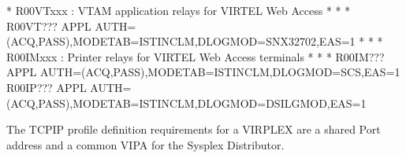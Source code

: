 \documentclass[letterpaper,10pt,english]{sphinxmanual}
\begin{document}
\begin{sphinxVerbatim}[commandchars=\\\{\}]
* R00VTxxx    : VTAM application relays for VIRTEL Web Access        *
* \PYGZhy{}\PYGZhy{}\PYGZhy{}\PYGZhy{}\PYGZhy{}\PYGZhy{}\PYGZhy{}\PYGZhy{}\PYGZhy{}\PYGZhy{}\PYGZhy{}\PYGZhy{}\PYGZhy{}\PYGZhy{}\PYGZhy{}\PYGZhy{}\PYGZhy{}\PYGZhy{}\PYGZhy{}\PYGZhy{}\PYGZhy{}\PYGZhy{}\PYGZhy{}\PYGZhy{}\PYGZhy{}\PYGZhy{}\PYGZhy{}\PYGZhy{}\PYGZhy{}\PYGZhy{}\PYGZhy{}\PYGZhy{}\PYGZhy{}\PYGZhy{}\PYGZhy{}\PYGZhy{}\PYGZhy{}\PYGZhy{}\PYGZhy{}\PYGZhy{}\PYGZhy{}\PYGZhy{}\PYGZhy{}\PYGZhy{}\PYGZhy{}\PYGZhy{}\PYGZhy{}\PYGZhy{}\PYGZhy{}\PYGZhy{}\PYGZhy{}\PYGZhy{}\PYGZhy{}\PYGZhy{}\PYGZhy{}\PYGZhy{}\PYGZhy{}\PYGZhy{}\PYGZhy{}\PYGZhy{}\PYGZhy{}\PYGZhy{}\PYGZhy{}\PYGZhy{}\PYGZhy{}\PYGZhy{} *
R00VT??? APPL  AUTH=(ACQ,PASS),MODETAB=ISTINCLM,DLOGMOD=SNX32702,EAS=1
* \PYGZhy{}\PYGZhy{}\PYGZhy{}\PYGZhy{}\PYGZhy{}\PYGZhy{}\PYGZhy{}\PYGZhy{}\PYGZhy{}\PYGZhy{}\PYGZhy{}\PYGZhy{}\PYGZhy{}\PYGZhy{}\PYGZhy{}\PYGZhy{}\PYGZhy{}\PYGZhy{}\PYGZhy{}\PYGZhy{}\PYGZhy{}\PYGZhy{}\PYGZhy{}\PYGZhy{}\PYGZhy{}\PYGZhy{}\PYGZhy{}\PYGZhy{}\PYGZhy{}\PYGZhy{}\PYGZhy{}\PYGZhy{}\PYGZhy{}\PYGZhy{}\PYGZhy{}\PYGZhy{}\PYGZhy{}\PYGZhy{}\PYGZhy{}\PYGZhy{}\PYGZhy{}\PYGZhy{}\PYGZhy{}\PYGZhy{}\PYGZhy{}\PYGZhy{}\PYGZhy{}\PYGZhy{}\PYGZhy{}\PYGZhy{}\PYGZhy{}\PYGZhy{}\PYGZhy{}\PYGZhy{}\PYGZhy{}\PYGZhy{}\PYGZhy{}\PYGZhy{}\PYGZhy{}\PYGZhy{}\PYGZhy{}\PYGZhy{}\PYGZhy{}\PYGZhy{}\PYGZhy{}\PYGZhy{} *
* R00IMxxx    : Printer relays for VIRTEL Web Access terminals       *
* \PYGZhy{}\PYGZhy{}\PYGZhy{}\PYGZhy{}\PYGZhy{}\PYGZhy{}\PYGZhy{}\PYGZhy{}\PYGZhy{}\PYGZhy{}\PYGZhy{}\PYGZhy{}\PYGZhy{}\PYGZhy{}\PYGZhy{}\PYGZhy{}\PYGZhy{}\PYGZhy{}\PYGZhy{}\PYGZhy{}\PYGZhy{}\PYGZhy{}\PYGZhy{}\PYGZhy{}\PYGZhy{}\PYGZhy{}\PYGZhy{}\PYGZhy{}\PYGZhy{}\PYGZhy{}\PYGZhy{}\PYGZhy{}\PYGZhy{}\PYGZhy{}\PYGZhy{}\PYGZhy{}\PYGZhy{}\PYGZhy{}\PYGZhy{}\PYGZhy{}\PYGZhy{}\PYGZhy{}\PYGZhy{}\PYGZhy{}\PYGZhy{}\PYGZhy{}\PYGZhy{}\PYGZhy{}\PYGZhy{}\PYGZhy{}\PYGZhy{}\PYGZhy{}\PYGZhy{}\PYGZhy{}\PYGZhy{}\PYGZhy{}\PYGZhy{}\PYGZhy{}\PYGZhy{}\PYGZhy{}\PYGZhy{}\PYGZhy{}\PYGZhy{}\PYGZhy{}\PYGZhy{}\PYGZhy{} *
R00IM??? APPL  AUTH=(ACQ,PASS),MODETAB=ISTINCLM,DLOGMOD=SCS,EAS=1
R00IP??? APPL  AUTH=(ACQ,PASS),MODETAB=ISTINCLM,DLOGMOD=DSILGMOD,EAS=1
\end{sphinxVerbatim}

\ignorespaces 
\sphinxAtStartPar
{}
The TCPIP profile definition requirements for a VIRPLEX are a shared Port address and a common VIPA for the Sysplex Distributor.
\end{document}
